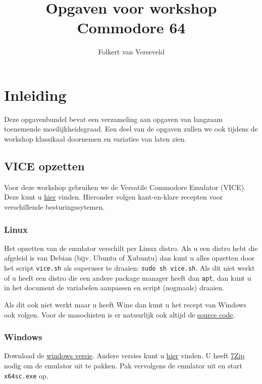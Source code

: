 \documentclass{article}
\title{Opgaven voor workshop Commodore 64}
\author{Folkert van Verseveld}
\begin{document}
\maketitle

\section{Inleiding}

Deze opgavenbundel bevat een verzameling aan opgaven van langzaam toenemende moeilijkheidsgraad.
Een deel van de opgaven zullen we ook tijdens de workshop klassikaal doornemen en variaties van laten zien.

\subsection{VICE opzetten}
Voor deze workshop gebruiken we de Versatile Commodore Emulator (VICE).
Deze kunt u \href{http://vice-emu.sourceforge.net/}{hier} vinden.
Hieronder volgen kant-en-klare recepten voor verschillende besturingssytemen.

\subsubsection{Linux}
Het opzetten van de emulator verschilt per Linux distro.
Als u een distro hebt die afgeleid is van Debian (bijv. Ubuntu of Xubuntu) dan kunt u alles opzetten door het script \verb:vice.sh: als superuser te draaien:
\verb:sudo sh vice.sh:.
Als dit niet werkt of u heeft een distro die een andere package manager heeft dan \verb:apt:, dan kunt u in het document de variabelen aanpassen en script (nogmaals) draaien.

Als dit ook niet werkt maar u heeft Wine dan kunt u het recept van Windows ook volgen.
Voor de masochisten is er natuurlijk ook altijd de \href{http://sourceforge.net/projects/vice-emu/files/releases/vice-3.1.tar.gz/download}{source code}.

\subsubsection{Windows}
Download de \href{http://sourceforge.net/projects/vice-emu/files/releases/binaries/windows/WinVICE-3.1-x64.7z/download}{windows versie}.
Andere versies kunt u \href{http://vice-emu.sourceforge.net/windows.html}{hier} vinden.
U heeft \href{http://www.7-zip.org/}{7Zip} nodig om de emulator uit te pakken.
Pak vervolgens de emulator uit en start \verb:x64sc.exe: op.
\end{document}
